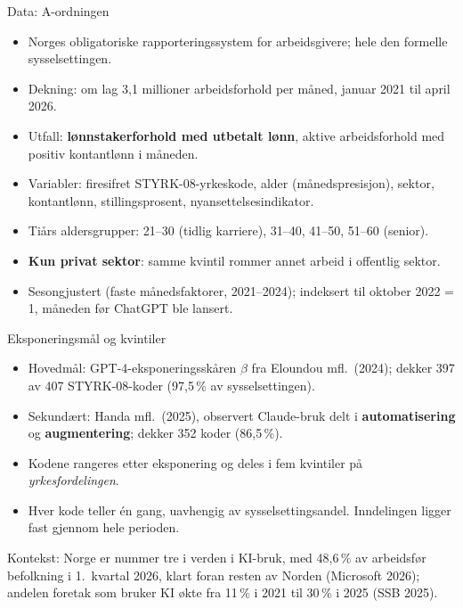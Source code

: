
\begin{frame}{Data: A-ordningen}
\begin{itemize}\setlength{\itemsep}{4pt}
  \item Norges obligatoriske rapporteringssystem for arbeidsgivere; hele den formelle sysselsettingen.
  \item Dekning: om lag 3,1 millioner arbeidsforhold per måned, januar 2021 til april 2026.
  \item Utfall: \textbf{lønnstakerforhold med utbetalt lønn}, aktive arbeidsforhold med positiv kontantlønn i måneden.
  \item Variabler: firesifret STYRK-08-yrkeskode, alder (månedspresisjon), sektor, kontantlønn, stillingsprosent, nyansettelsesindikator.
  \item Tiårs aldersgrupper: 21--30 (tidlig karriere), 31--40, 41--50, 51--60 (senior).
  \item \textbf{Kun privat sektor}: samme kvintil rommer annet arbeid i offentlig sektor.
  \item Sesongjustert (faste månedsfaktorer, 2021--2024); indeksert til oktober 2022 = 1, måneden før ChatGPT ble lansert.
\end{itemize}
\end{frame}

\begin{frame}{Eksponeringsmål og kvintiler}
\begin{itemize}\setlength{\itemsep}{6pt}
  \item Hovedmål: GPT-4-eksponeringsskåren $\beta$ fra Eloundou mfl.\ (2024); dekker 397 av 407 STYRK-08-koder (97,5\,\% av sysselsettingen).
  \item Sekundært: Handa mfl.\ (2025), observert Claude-bruk delt i \textbf{automatisering} og \textbf{augmentering}; dekker 352 koder (86,5\,\%).
  \item Kodene rangeres etter eksponering og deles i fem kvintiler på \emph{yrkesfordelingen}.
  \item Hver kode teller én gang, uavhengig av sysselsettingsandel. Inndelingen ligger fast gjennom hele perioden.
\end{itemize}

\vspace{0.4em}
\footnotesize
Kontekst: Norge er nummer tre i verden i KI-bruk, med 48,6\,\% av arbeidsfør befolkning i 1.\ kvartal 2026, klart foran resten av Norden (Microsoft 2026); andelen foretak som bruker KI økte fra 11\,\% i 2021 til 30\,\% i 2025 (SSB 2025).
\end{frame}

